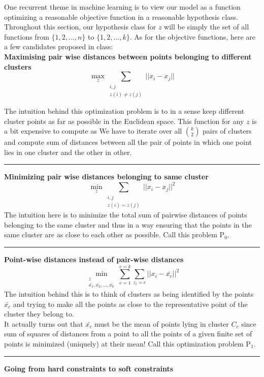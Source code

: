 \documentclass[12pt]{article}
\begin{document}
One recurrent theme in machine learning is to view our model as a function optimizing a reasonable objective function in a reasonable hypothesis class. Throughout this section, our hypothesis class for $z$ will be simply the set of all functions from $\{1,2,\dots,n\}$ to $\{1,2,\dots,k\}$. As for the objective functions, here are a few candidates proposed in class:\\
    \noindent\textbf{Maximising pair wise distances between points belonging to different clusters}
    $$\max_{z}\sum_{\substack {i,j \\ z(i) \neq z(j)}} ||x_i-x_j||$$

    The intuition behind this optimization problem is to in a sense keep different cluster points as far as possible in the Euclidean space. This function for any $z$ is a bit expensive to compute as We have to iterate over all $k \choose 2$ pairs of clusters and compute sum of distances between all the pair of points in which one point lies in one cluster and the other in other.\\
    \hrule
    \vspace{5pt}
     \noindent\textbf{Minimizing pair wise distances belonging to same cluster}
    $$\min_{z}\sum_{\substack {i,j \\ z(i) = z(j)}} ||x_i-x_j||^2$$
    The intuition here is to minimize the total sum of pairwise distances of points belonging to the same cluster and thus in a way ensuring that the points in the same cluster are as close to each other as possible. Call this problem $\text{P}_0.$
     \vspace{8pt}
    \hrule
     \vspace{5pt}
    \noindent\textbf{Point-wise distances instead of pair-wise distances}
    $$\min_{\substack{z \\ \bar{x_1},\bar{x_2},\dots,\bar{x_k}}}\sum_{c=1}^{c=k}\sum_{z_i=c}||x_i-\bar{x_c}||^2$$
    The intuition behind this is to think of clusters as being identified by the points $\bar{x_c}$ and trying to make all the points as close to the representative point of the cluster they belong to.\\
    It actually turns out that $\bar{x_c}$ must be the mean of points lying in cluster $C_c$ since sum of squares of distances from a point to all the points of a given finite set of points is minimized (uniquely) at their mean!
    Call this optimization problem $\text{P}_1$.
     \vspace{8pt}
    \hrule
     \vspace{5pt}
     \noindent\textbf{Going from hard constraints to soft constraints}
\end{document}

